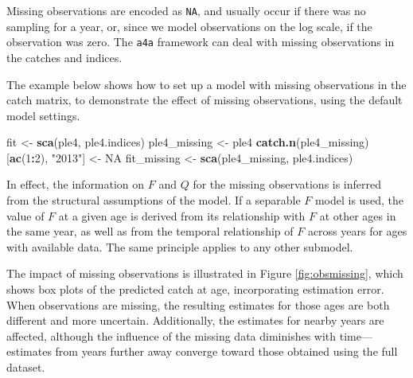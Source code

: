 \documentclass[
]{book}
\newenvironment{Shaded}{\begin{snugshade}}{\end{snugshade}}
\newcommand{\ConstantTok}[1]{\textcolor[rgb]{0.56,0.35,0.01}{#1}}
\newcommand{\DecValTok}[1]{\textcolor[rgb]{0.00,0.00,0.81}{#1}}
\newcommand{\FunctionTok}[1]{\textcolor[rgb]{0.13,0.29,0.53}{\textbf{#1}}}
\newcommand{\NormalTok}[1]{#1}
\newcommand{\OtherTok}[1]{\textcolor[rgb]{0.56,0.35,0.01}{#1}}
\newcommand{\SpecialCharTok}[1]{\textcolor[rgb]{0.81,0.36,0.00}{\textbf{#1}}}
\newcommand{\StringTok}[1]{\textcolor[rgb]{0.31,0.60,0.02}{#1}}
\begin{document}
Missing observations are encoded as \texttt{NA}, and usually occur if there was no sampling for a year, or, since we model observations on the log scale, if the observation was zero. The \texttt{a4a} framework can deal with missing observations in the catches and indices.

The example below shows how to set up a model with missing observations in the catch matrix, to demonstrate the effect of missing observations, using the default model settings.

\begin{Shaded}
\begin{Highlighting}[]
\NormalTok{fit }\OtherTok{\textless{}{-}} \FunctionTok{sca}\NormalTok{(ple4, ple4.indices)}
\NormalTok{ple4\_missing }\OtherTok{\textless{}{-}}\NormalTok{ ple4}
\FunctionTok{catch.n}\NormalTok{(ple4\_missing)[}\FunctionTok{ac}\NormalTok{(}\DecValTok{1}\SpecialCharTok{:}\DecValTok{2}\NormalTok{), }\StringTok{"2013"}\NormalTok{] }\OtherTok{\textless{}{-}} \ConstantTok{NA}
\NormalTok{fit\_missing }\OtherTok{\textless{}{-}} \FunctionTok{sca}\NormalTok{(ple4\_missing, ple4.indices)}
\end{Highlighting}
\end{Shaded}

In effect, the information on \(F\) and \(Q\) for the missing observations is inferred from the structural assumptions of the model. If a separable \(F\) model is used, the value of \(F\) at a given age is derived from its relationship with \(F\) at other ages in the same year, as well as from the temporal relationship of \(F\) across years for ages with available data. The same principle applies to any other submodel.

The impact of missing observations is illustrated in Figure \ref{fig:obsmissing}, which shows box plots of the predicted catch at age, incorporating estimation error. When observations are missing, the resulting estimates for those ages are both different and more uncertain. Additionally, the estimates for nearby years are affected, although the influence of the missing data diminishes with time---estimates from years further away converge toward those obtained using the full dataset.
\end{document}
